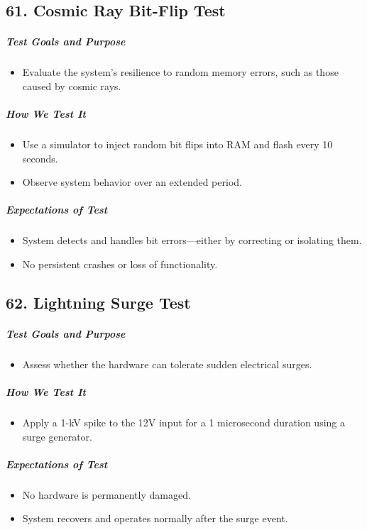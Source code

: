 \subsection*{61. Cosmic Ray Bit-Flip Test}
\subparagraph{Test Goals and Purpose}
\begin{itemize}
    \item Evaluate the system’s resilience to random memory errors, such as those caused by cosmic rays.
\end{itemize}
\subparagraph{How We Test It}
\begin{itemize}
    \item Use a simulator to inject random bit flips into RAM and flash every 10 seconds.
    \item Observe system behavior over an extended period.
\end{itemize}
\subparagraph{Expectations of Test}
\begin{itemize}
    \item System detects and handles bit errors—either by correcting or isolating them.
    \item No persistent crashes or loss of functionality.
\end{itemize}

\subsection*{62. Lightning Surge Test}
\subparagraph{Test Goals and Purpose}
\begin{itemize}
    \item Assess whether the hardware can tolerate sudden electrical surges.
\end{itemize}
\subparagraph{How We Test It}
\begin{itemize}
    \item Apply a 1-kV spike to the 12V input for a 1 microsecond duration using a surge generator.
\end{itemize}
\subparagraph{Expectations of Test}
\begin{itemize}
    \item No hardware is permanently damaged.
    \item System recovers and operates normally after the surge event.
\end{itemize}

